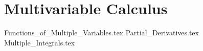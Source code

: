 \section{Multivariable Calculus}

{Functions_of_Multiple_Variables.tex}
{Partial_Derivatives.tex}
{Multiple_Integrals.tex}
